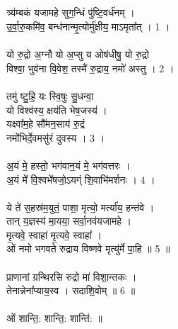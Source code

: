 \subsection{}
त्र्य॑म्बकं यजामहे सुग॒न्धिं पु॑ष्टि॒वर्ध॑नम् ।\\
उ॒र्वा॒रु॒कमि॑व॒ बन्ध॑नान्मृ॒त्योर्मु॑क्षीय॒ माऽमृता᳚त् । 1 ।\\
\\
यो रु॒द्रो अ॒ग्नौ यो अ॒प्सु य ओष॑धीषु॒ यो रु॒द्रो\\
विश्वा॒ भुव॑ना वि॒वेश॒ तस्मै॑ रु॒द्राय॒ नमो॑ अस्तु । 2 ।\\
\\
तमु॑ ष्टु॒हि॒ यः स्वि॒षुः सु॒धन्वा॒\\
यो विश्व॑स्य॒ क्षय॑ति भेष॒जस्य॑ ।\\
यक्ष्वा᳚म॒हे सौ᳚मन॒साय॑ रु॒द्रं\\
नमो᳚भिर्दे॒वमसु॑रं दुवस्य । 3 ।\\
\\
अ॒यं मे॒ हस्तो॒ भग॑वान॒यं मे॒ भग॑वत्तरः ।\\
अ॒यं मे᳚ वि॒श्वभे᳚षजो॒ऽयग्ं शि॒वाभि॑मर्शनः । 4 ।\\
\\
ये ते॑ स॒हस्र॑म॒युतं॒ पाशा॒ मृत्यो॒ मर्त्या॑य॒ हन्त॑वे ।\\
तान् य॒ज्ञस्य॑ मा॒यया॒ सर्वा॒नव॑यजामहे ।\\
मृ॒त्यवे॒ स्वाहा॑ मृ॒त्यवे॒ स्वाहा᳚ ।\\
ओं नमो भगवते रुद्राय विष्णवे मृत्यु॑र्मे पा॒हि ॥ 5 ॥\\
\\
प्राणानां ग्रन्थिरसि रुद्रो मा॑ विशा॒न्तकः ।\\
तेनान्नेना᳚प्याय॒स्व । सदाशि॒वोम् ॥ 6 ॥\\
\\
ओं शान्ति॒: शान्ति॒: शान्ति॑: ॥\\
